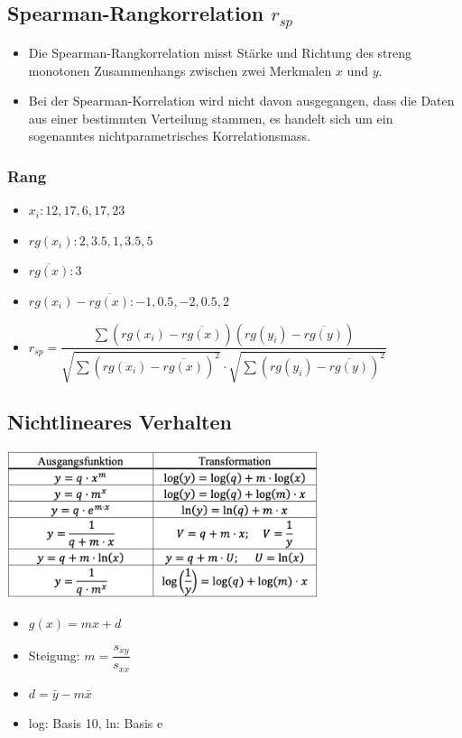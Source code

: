 \documentclass[8pt,a4paper]{scrartcl}
\begin{document}
\begin{multicols*}{3}
			\subsection{Spearman-Rangkorrelation $r_{sp}$}		
				\begin{itemize}\itemsep0pt				
					\item Die Spearman-Rangkorrelation misst Stärke und Richtung des streng monotonen Zusammenhangs zwischen  zwei Merkmalen $x$ und $y$.
					\item Bei  der  Spearman-Korrelation  wird  nicht  davon ausgegangen,  dass  die  Daten  aus  einer bestimmten  Verteilung stammen,  es  handelt  sich  um  ein sogenanntes nichtparametrisches Korrelationsmass. 
				\end{itemize}		
					
				\subsubsection{Rang}		
					\begin{itemize}\itemsep0pt				
					\item $x_{i}: 12, 17, 6, 17, 23$
					\item $rg(x_{i}): 2, 3.5, 1, 3.5, 5$
					\item $\overline{rg(x)}: 3$
					\item $rg(x_{i})-\overline{rg(x)}: -1, 0.5, -2, 0.5, 2$
					\item $r_{sp}=\dfrac{\sum (rg(x_{i})-\overline{rg(x)})(rg(y_{i})-\overline{rg(y)})}{\sqrt{\sum (rg(x_{i})-\overline{rg(x)})^{2}} \cdot \sqrt{\sum (rg(y_{i})-\overline{rg(y)})^{2}}}$
				\end{itemize}
				
			 \subsection{Nichtlineares Verhalten}
			     \includegraphics[height=4.3cm]{img/regression1.png}
			     \begin{itemize}\itemsep0pt				
					\item $g(x) = mx + d$
					\item Steigung: $m = \dfrac{s_{xy}}{s_{xx}}$
					\item $d = \bar{y} - m\bar{x}$
					\item log: Basis 10, ln: Basis e
				\end{itemize}



\end{multicols*}
\end{document}

